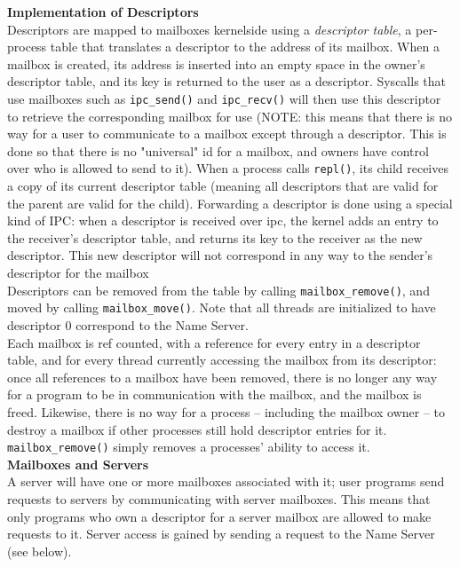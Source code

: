 \documentclass{article}
\begin{document}
\textbf{Implementation of Descriptors}\\
Descriptors are mapped to mailboxes kernelside using a \emph{descriptor table}, a per-process table that translates a descriptor to the address of its mailbox.  When a mailbox is created, its address is inserted into an empty space in the owner's descriptor table, and its key is returned to the user as a descriptor.  Syscalls that use mailboxes such as \verb|ipc_send()| and \verb|ipc_recv()| will then use this descriptor to retrieve the corresponding mailbox for use (NOTE: this means that there is no way for a user to communicate to a mailbox except through a descriptor.  This is done so that there is no "universal" id for a mailbox, and owners have control over who is allowed to send to it).  When a process calls \verb|repl()|, its child receives a copy of its current descriptor table (meaning all descriptors that are valid for the parent are valid for the child).  Forwarding a descriptor is done using a special kind of IPC: when a descriptor is received over ipc, the kernel adds an entry to the receiver's descriptor table, and returns its key to the receiver as the new descriptor. This new descriptor will not correspond in any way to the sender's descriptor for the mailbox\\

Descriptors can be removed from the table by calling \verb|mailbox_remove()|, and moved by calling \verb|mailbox_move()|.  Note that all threads are initialized to have descriptor 0 correspond to the Name Server.\\

Each mailbox is ref counted, with a reference for every entry in a descriptor table, and for every thread currently accessing the mailbox from its descriptor: once all references to a mailbox have been removed, there is no longer any way for a program to be in communication with the mailbox, and the mailbox is freed.  Likewise, there is no way for a process -- including the mailbox owner -- to destroy a mailbox if other processes still hold descriptor entries for it.  \verb|mailbox_remove()| simply removes a processes' ability to access it.\\

\textbf{Mailboxes and Servers}\\
A server will have one or more mailboxes associated with it; user programs send requests to servers by communicating with server mailboxes. This means that only programs who own a descriptor for a server mailbox are allowed to make requests to it.  Server access is gained by sending a request to the Name Server (see below).
 
\end{document}
